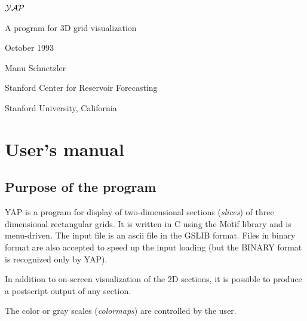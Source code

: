 \setcounter{tocdepth}{1}
\setlength{\unitlength}{1cm}

\pagestyle{empty}



\begin{center}
\LARGE

${\cal YAP}$

\vspace{3cm}

A program for 3D grid visualization

\large

\vspace{7cm}

October 1993

\vspace{1 cm}

Manu Schnetzler

\vspace{2cm}

Stanford Center for Reservoir Forecasting

Stanford University, California

\end{center}

\clearpage
{}
\pagestyle{headings}

\tableofcontents

\listoffigures

\clearpage

\chapter{User's manual}

\section{Purpose of the program}

YAP is a program for display of two-dimensional sections ({\em slices})
of three dimensional rectangular grids. It is written in C using
the Motif library and is menu-driven.
The input file is an ascii file in the GSLIB format.
Files in binary format are also accepted to speed up the input loading (but
the BINARY format is recognized only by YAP).

In addition to on-screen visualization of the 2D sections, it
is possible to produce a postscript output of any section.

The color or gray scales ({\em colormaps}) are controlled by the user.

